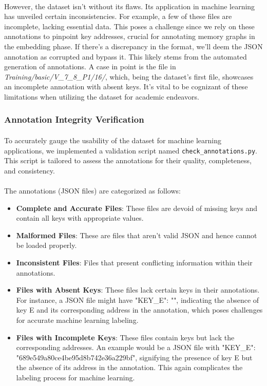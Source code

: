         \paragraph{}However, the dataset isn't without its flaws. Its application in machine learning has unveiled certain inconsistencies. For example, a few of these files are incomplete, lacking essential data. This poses a challenge since we rely on these annotations to pinpoint key addresses, crucial for annotating memory graphs in the embedding phase. If there's a discrepancy in the format, we'll deem the JSON annotation as corrupted and bypass it. This likely stems from the automated generation of annotations. A case in point is the file in \textit{Training/basic/V\_7\_8\_P1/16/}, which, being the dataset's first file, showcases an incomplete annotation with absent keys. It's vital to be cognizant of these limitations when utilizing the dataset for academic endeavors.
        
        \subsubsection{Annotation Integrity Verification}
            \paragraph{}To accurately gauge the usability of the dataset for machine learning applications, we implemented a validation script named \texttt{check\_annotations.py}. This script is tailored to assess the annotations for their quality, completeness, and consistency.

            \paragraph{}The annotations (JSON files) are categorized as follows:
            \begin{itemize}
                \item \textbf{Complete and Accurate Files}: These files are devoid of missing keys and contain all keys with appropriate values.
                \item \textbf{Malformed Files}: These are files that aren't valid JSON and hence cannot be loaded properly.
                \item \textbf{Inconsistent Files}: Files that present conflicting information within their annotations.
                \item \textbf{Files with Absent Keys}: These files lack certain keys in their annotations. For instance, a JSON file might have "KEY\_E": "", indicating the absence of key E and its corresponding address in the annotation, which poses challenges for accurate machine learning labeling.
                \item \textbf{Files with Incomplete Keys}: These files contain keys but lack the corresponding addresses. An example would be a JSON file with "KEY\_E": "689e549a80ce4be95d8b742e36a229bf", signifying the presence of key E but the absence of its address in the annotation. This again complicates the labeling process for machine learning.
            \end{itemize}
